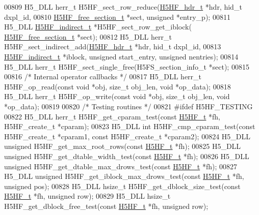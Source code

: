 \begin{DoxyCode}
00809 H5\_DLL herr\_t H5HF\_sect\_row\_reduce(\hyperlink{struct_h5_h_f__hdr__t}{H5HF\_hdr\_t} *hdr, hid\_t dxpl\_id,
00810     \hyperlink{struct_h5_h_f__free__section__t}{H5HF\_free\_section\_t} *sect, \textcolor{keywordtype}{unsigned} *entry\_p);
00811 H5\_DLL \hyperlink{struct_h5_h_f__indirect__t}{H5HF\_indirect\_t} *H5HF\_sect\_row\_get\_iblock(
      \hyperlink{struct_h5_h_f__free__section__t}{H5HF\_free\_section\_t} *sect);
00812 H5\_DLL herr\_t H5HF\_sect\_indirect\_add(\hyperlink{struct_h5_h_f__hdr__t}{H5HF\_hdr\_t} *hdr, hid\_t dxpl\_id,
00813     \hyperlink{struct_h5_h_f__indirect__t}{H5HF\_indirect\_t} *iblock, \textcolor{keywordtype}{unsigned} start\_entry, \textcolor{keywordtype}{unsigned} nentries);
00814 H5\_DLL herr\_t H5HF\_sect\_single\_free(H5FS\_section\_info\_t *sect);
00815 
00816 \textcolor{comment}{/* Internal operator callbacks */}
00817 H5\_DLL herr\_t H5HF\_op\_read(\textcolor{keyword}{const} \textcolor{keywordtype}{void} *obj, \textcolor{keywordtype}{size\_t} obj\_len, \textcolor{keywordtype}{void} *op\_data);
00818 H5\_DLL herr\_t H5HF\_op\_write(\textcolor{keyword}{const} \textcolor{keywordtype}{void} *obj, \textcolor{keywordtype}{size\_t} obj\_len, \textcolor{keywordtype}{void} *op\_data);
00819 
00820 \textcolor{comment}{/* Testing routines */}
00821 \textcolor{preprocessor}{#ifdef H5HF\_TESTING}
00822 H5\_DLL herr\_t H5HF\_get\_cparam\_test(\textcolor{keyword}{const} \hyperlink{struct_h5_h_f__t}{H5HF\_t} *fh, H5HF\_create\_t *cparam);
00823 H5\_DLL \textcolor{keywordtype}{int} H5HF\_cmp\_cparam\_test(\textcolor{keyword}{const} H5HF\_create\_t *cparam1, \textcolor{keyword}{const} H5HF\_create\_t *cparam2);
00824 H5\_DLL \textcolor{keywordtype}{unsigned} H5HF\_get\_max\_root\_rows(\textcolor{keyword}{const} \hyperlink{struct_h5_h_f__t}{H5HF\_t} *fh);
00825 H5\_DLL \textcolor{keywordtype}{unsigned} H5HF\_get\_dtable\_width\_test(\textcolor{keyword}{const} \hyperlink{struct_h5_h_f__t}{H5HF\_t} *fh);
00826 H5\_DLL \textcolor{keywordtype}{unsigned} H5HF\_get\_dtable\_max\_drows\_test(\textcolor{keyword}{const} \hyperlink{struct_h5_h_f__t}{H5HF\_t} *fh);
00827 H5\_DLL \textcolor{keywordtype}{unsigned} H5HF\_get\_iblock\_max\_drows\_test(\textcolor{keyword}{const} \hyperlink{struct_h5_h_f__t}{H5HF\_t} *fh, \textcolor{keywordtype}{unsigned} pos);
00828 H5\_DLL hsize\_t H5HF\_get\_dblock\_size\_test(\textcolor{keyword}{const} \hyperlink{struct_h5_h_f__t}{H5HF\_t} *fh, \textcolor{keywordtype}{unsigned} row);
00829 H5\_DLL hsize\_t H5HF\_get\_dblock\_free\_test(\textcolor{keyword}{const} \hyperlink{struct_h5_h_f__t}{H5HF\_t} *fh, \textcolor{keywordtype}{unsigned} row);

\end{DoxyCode}
